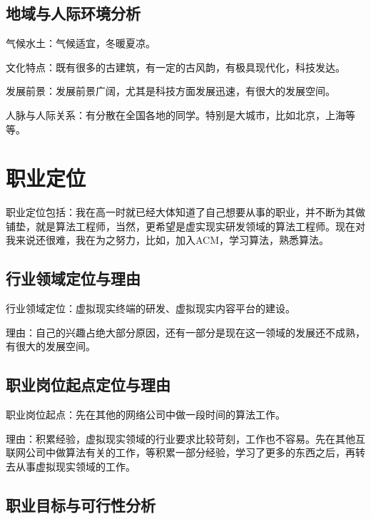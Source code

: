 \documentclass{article}
\begin{document}
\subsection{地域与人际环境分析}
\par
气候水土：气候适宜，冬暖夏凉。\par
文化特点：既有很多的古建筑，有一定的古风韵，有极具现代化，科技发达。\par
发展前景：发展前景广阔，尤其是科技方面发展迅速，有很大的发展空间。\par
人脉与人际关系：有分散在全国各地的同学。特别是大城市，比如北京，上海等等。

\par 

\section{职业定位}

\par
职业定位包括：我在高一时就已经大体知道了自己想要从事的职业，并不断为其做铺垫，就是算法工程师，当然，更希望是虚实现实研发领域的算法工程师。现在对我来说还很难，我在为之努力，比如，加入ACM，学习算法，熟悉算法。\par

\subsection{行业领域定位与理由}
\par
行业领域定位：虚拟现实终端的研发、虚拟现实内容平台的建设。
\par
理由：自己的兴趣占绝大部分原因，还有一部分是现在这一领域的发展还不成熟，有很大的发展空间。
\par
\subsection{职业岗位起点定位与理由}
\par
职业岗位起点：先在其他的网络公司中做一段时间的算法工作。\par
理由：积累经验，虚拟现实领域的行业要求比较苛刻，工作也不容易。先在其他互联网公司中做算法有关的工作，等积累一部分经验，学习了更多的东西之后，再转去从事虚拟现实领域的工作。\par

\subsection{职业目标与可行性分析}
\par
 
\end{document}
